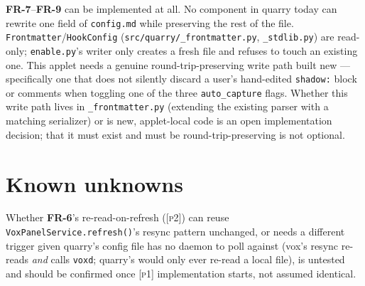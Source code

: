 \documentclass[a4paper,11pt]{report}
\newcommand{\fr}[1]{\textbf{FR-#1}}
\newcommand{\pone}{\textsc{[p1]}}
\newcommand{\ptwo}{\textsc{[p2]}}
\begin{document}
\begin{enumerate}
{    \fr{7}--\fr{9} can be implemented at all.} No component in quarry
    today can rewrite one field of \texttt{config.md} while preserving
    the rest of the file. \texttt{Frontmatter}/\texttt{HookConfig}
    (\texttt{src/quarry/\_frontmatter.py}, \texttt{\_stdlib.py}) are
    read-only; \texttt{enable.py}'s writer only creates a fresh file and
    refuses to touch an existing one. This applet needs a genuine
    round-trip-preserving write path built new --- specifically one that
    does not silently discard a user's hand-edited \texttt{shadow:}
    block or comments when toggling one of the three
    \texttt{auto\_capture} flags. Whether this write path lives in
    \texttt{\_frontmatter.py} (extending the existing parser with a
    matching serializer) or is new, applet-local code is an open
    implementation decision; that it must exist and must be
    round-trip-preserving is not optional.
\end{enumerate}

\section{Known unknowns}

Whether \fr{6}'s re-read-on-refresh (\ptwo{}) can reuse
\texttt{VoxPanelService.refresh()}'s resync pattern unchanged, or needs a
different trigger given quarry's config file has no daemon to poll
against (vox's resync re-reads \emph{and} calls \texttt{voxd}; quarry's
would only ever re-read a local file), is untested and should be
confirmed once \pone{} implementation starts, not assumed identical.
\end{document}
